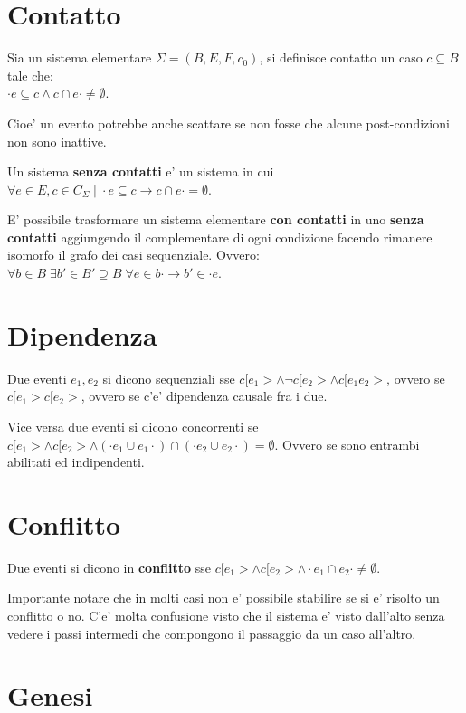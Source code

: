 \section{Contatto}

Sia un sistema elementare $\Sigma = (B, E, F, c_0)$, si definisce contatto un caso $c \subseteq B$ tale che: \\
$\cdot e \subseteq c \land c \cap e \cdot \neq \emptyset$.

Cioe' un evento potrebbe anche scattare se non fosse che alcune post-condizioni non sono inattive.

Un sistema \textbf{senza contatti} e' un sistema in cui $\forall e \in E, c \in C_\Sigma \; | \; \cdot e \subseteq c \rightarrow c \cap e \cdot = \emptyset$.

E' possibile trasformare un sistema elementare \textbf{con contatti} in uno \textbf{senza contatti} aggiungendo il complementare di ogni condizione facendo rimanere isomorfo il grafo dei casi sequenziale.
Ovvero: $\forall b \in B\; \exists b' \in B' \supseteq B \; \forall e \in b \cdot \rightarrow b' \in \cdot e$.


\section{Dipendenza}

Due eventi $e_1,e_2$ si dicono sequenziali sse $c[e_1> \land \neg c[e_2> \land c[e_1e_2 >$, ovvero se $c[e_1 > c[e_2 >$, ovvero se c'e' dipendenza causale fra i due.

Vice versa due eventi si dicono concorrenti se $c[e_1> \land c[e_2> \land (\cdot e_1 \cup e_1 \cdot) \cap (\cdot e_2 \cup e_2 \cdot) = \emptyset$.
Ovvero se sono entrambi abilitati ed indipendenti.

\section{Conflitto}

Due eventi si dicono in \textbf{conflitto} sse $c[e_1> \land c[e_2> \land \cdot e_1 \cap e_2 \cdot \neq \emptyset$.

Importante notare che in molti casi non e' possibile stabilire se si e' risolto un conflitto o no. C'e' molta confusione visto che il sistema e' visto dall'alto senza vedere i passi intermedi che compongono il passaggio da un caso all'altro.

\section{Genesi}

